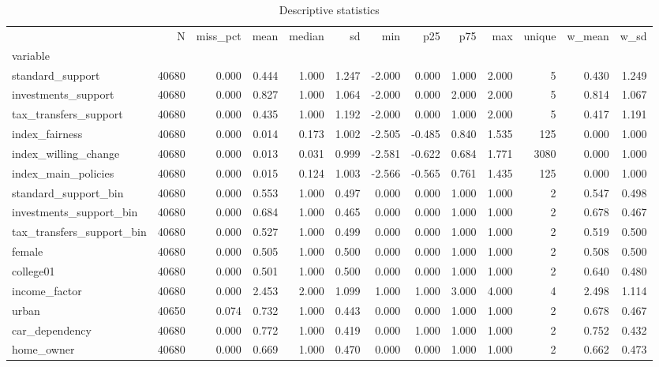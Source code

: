 \begin{table}
\caption{Descriptive statistics}
\label{tab:desc}
\begin{tabular}{lrrrrrrrrrrrr}
\toprule
 & N & miss_pct & mean & median & sd & min & p25 & p75 & max & unique & w_mean & w_sd \\
variable &  &  &  &  &  &  &  &  &  &  &  &  \\
\midrule
standard_support & 40680 & 0.000 & 0.444 & 1.000 & 1.247 & -2.000 & 0.000 & 1.000 & 2.000 & 5 & 0.430 & 1.249 \\
investments_support & 40680 & 0.000 & 0.827 & 1.000 & 1.064 & -2.000 & 0.000 & 2.000 & 2.000 & 5 & 0.814 & 1.067 \\
tax_transfers_support & 40680 & 0.000 & 0.435 & 1.000 & 1.192 & -2.000 & 0.000 & 1.000 & 2.000 & 5 & 0.417 & 1.191 \\
index_fairness & 40680 & 0.000 & 0.014 & 0.173 & 1.002 & -2.505 & -0.485 & 0.840 & 1.535 & 125 & 0.000 & 1.000 \\
index_willing_change & 40680 & 0.000 & 0.013 & 0.031 & 0.999 & -2.581 & -0.622 & 0.684 & 1.771 & 3080 & 0.000 & 1.000 \\
index_main_policies & 40680 & 0.000 & 0.015 & 0.124 & 1.003 & -2.566 & -0.565 & 0.761 & 1.435 & 125 & 0.000 & 1.000 \\
standard_support_bin & 40680 & 0.000 & 0.553 & 1.000 & 0.497 & 0.000 & 0.000 & 1.000 & 1.000 & 2 & 0.547 & 0.498 \\
investments_support_bin & 40680 & 0.000 & 0.684 & 1.000 & 0.465 & 0.000 & 0.000 & 1.000 & 1.000 & 2 & 0.678 & 0.467 \\
tax_transfers_support_bin & 40680 & 0.000 & 0.527 & 1.000 & 0.499 & 0.000 & 0.000 & 1.000 & 1.000 & 2 & 0.519 & 0.500 \\
female & 40680 & 0.000 & 0.505 & 1.000 & 0.500 & 0.000 & 0.000 & 1.000 & 1.000 & 2 & 0.508 & 0.500 \\
college01 & 40680 & 0.000 & 0.501 & 1.000 & 0.500 & 0.000 & 0.000 & 1.000 & 1.000 & 2 & 0.640 & 0.480 \\
income_factor & 40680 & 0.000 & 2.453 & 2.000 & 1.099 & 1.000 & 1.000 & 3.000 & 4.000 & 4 & 2.498 & 1.114 \\
urban & 40650 & 0.074 & 0.732 & 1.000 & 0.443 & 0.000 & 0.000 & 1.000 & 1.000 & 2 & 0.678 & 0.467 \\
car_dependency & 40680 & 0.000 & 0.772 & 1.000 & 0.419 & 0.000 & 1.000 & 1.000 & 1.000 & 2 & 0.752 & 0.432 \\
home_owner & 40680 & 0.000 & 0.669 & 1.000 & 0.470 & 0.000 & 0.000 & 1.000 & 1.000 & 2 & 0.662 & 0.473 \\

\end{tabular}
\end{table}
